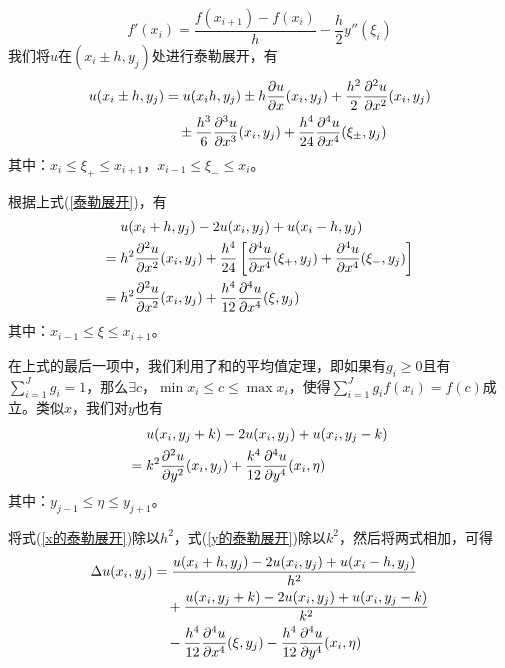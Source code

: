             \[
                f'(x_i) = \frac{f(x_{i+1}) - f(x_i)}{h} - \frac{h}{2} y''(\xi_i)
            \]
            我们将$u$在$(x_{i}\pm h, y_j)$处进行泰勒展开，有
            \begin{align}
                \label{泰勒展开}
               u (x_i\pm h,y_j)
               &= u (x_i h,y_j) \pm h \frac{\partial u}{\partial x}(x_i,y_j) + \frac{h^2}{2} \frac{\partial^2 u}{\partial x^2}(x_i,y_j) \notag\\
               &\quad\pm \frac{h^3}{6} \frac{\partial^3 u}{\partial x^3}(x_i,y_j) + \frac{h^4}{24} \frac{\partial^4 u}{\partial x^4}(\xi_\pm,y_j)
            \end{align}
            其中：$x_i \leqslant \xi_+ \leqslant x_{i+1}$，$x_{i-1} \leqslant \xi_- \leqslant x_{i}$。
            \par
            根据上式(\ref{泰勒展开})，有
            \begin{align}
            \label{x的泰勒展开}
                   &u (x_i + h,y_j) -2u(x_i,y_j) + u(x_i-h,y_j) \notag\\
               ={} &h^2 \frac{\partial^2 u}{\partial x^2}(x_i,y_j) + \frac{h^4}{24} \left[
               \frac{\partial^4 u}{\partial x^4}(\xi_+,y_j) + \frac{\partial^4 u}{\partial x^4}(\xi_-,y_j)
               \right] \notag \\
               ={} &h^2 \frac{\partial^2 u}{\partial x^2}(x_i,y_j) + \frac{h^4}{12} \frac{\partial^4 u}{\partial x^4}(\xi,y_j)
            \end{align}
            其中：$x_{i-1} \leqslant \xi \leqslant x_{i+1}$。
            \par
            在上式的最后一项中，我们利用了和的平均值定理，即如果有$g_i \geqslant 0$且有$\sum _{i =1}^J g_i = 1$，那么$\exists c$，$ \min x_i \leqslant c \leqslant \max x_i$，使得$\sum _{i =1}^J g_if(x_i) = f(c)$成立。类似$x$，我们对$y$也有
            \begin{align}
            \label{y的泰勒展开}
                   &u (x_i ,y_j + k) - 2u(x_i,y_j) + u(x_i,y_j - k) \notag \\
               ={} &k^2 \frac{\partial^2 u}{\partial y^2}(x_i,y_j) + \frac{k^4}{12} \frac{\partial^4 u}{\partial y^4}(x_i,\eta)
            \end{align}
            其中：$y_{j-1} \leqslant \eta \leqslant y_{j+1}$。
            \par
            将式(\ref{x的泰勒展开})除以$h^2$，式(\ref{y的泰勒展开})除以$k^2$，然后将两式相加，可得
            \begin{align}
            \label{u的泰勒展开}
                \Delta u(x_i,y_j) &= \frac{u(x_i+h,y_j) - 2u(x_i,y_j)+u(x_i-h, y_j)}{h^2}\notag \\
                &\quad + \frac{u(x_i,y_j + k) - 2u(x_i,y_j)+u(x_i, y_j - k)}{k^2}\notag \\
                &\quad - \frac{h^4}{12} \frac{\partial^4 u}{\partial x^4}(\xi,y_j) - \frac{h^4}{12} \frac{\partial^4 u}{\partial y^4}(x_i,\eta)
            \end{align}

